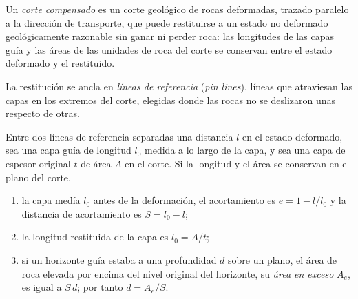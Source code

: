 \begin{definition}\label{def:b2:alpine-orogen:balanced}
Un \emph{corte compensado} es un corte geológico de rocas deformadas,
trazado paralelo a la dirección de transporte, que puede restituirse a un estado no deformado geológicamente
razonable sin ganar ni perder roca: las longitudes de las capas guía y
las áreas de las unidades de roca del corte se conservan entre el estado deformado y el
restituido.
\end{definition}

La restitución se ancla en \emph{líneas de referencia} (\textit{pin lines}), líneas que atraviesan las capas en los extremos del
corte, elegidas donde las rocas no se deslizaron unas respecto de otras.

\begin{proposition}\label{prop:b2:alpine-orogen:balance}
Entre dos líneas de referencia separadas una distancia $l$ en el estado deformado, sea una capa guía de
longitud $l_0$ medida a lo largo de la capa, y sea una capa de espesor original $t$ de
área $A$ en el corte. Si la longitud y el área se conservan en el plano del corte,
\begin{enumerate}
\item la capa medía $l_0$ antes de la deformación, el acortamiento es
$e = 1 - l/l_0$ y la distancia de acortamiento es $S = l_0 - l$;
\item la longitud restituida de la capa es $l_0 = A/t$;
\item si un horizonte guía estaba a una profundidad $d$ sobre un  plano, el área de roca
elevada por encima del nivel original del horizonte, su \emph{área en exceso} $A_e$, es igual a $S\,d$;
por tanto $d = A_e/S$.
\end{enumerate}
\end{proposition}

